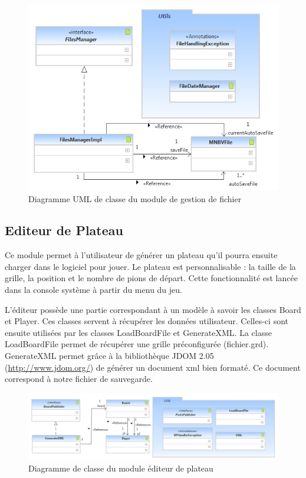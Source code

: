\begin{figure}[H]
\centering
\includegraphics[scale=1.0]{Architecture/FilesManagerLight.png}
\caption{Diagramme UML de classe du module de gestion de fichier}
\label{gest}
\end{figure}


\subsection{Editeur de Plateau}

Ce module permet à l'utilisateur de générer un plateau qu'il pourra ensuite charger dans le logiciel pour jouer. Le plateau est personnalisable : la taille de la grille, la position et le nombre de pions de départ. Cette fonctionnalité est lancée dans la console système à partir du menu du jeu.

L'éditeur possède une partie correspondant à un modèle à savoir les classes Board et Player. Ces classes servent à récupérer les données utilisateur. Celles-ci sont ensuite utilisées par les classes LoadBoardFile et GenerateXML. La classe LoadBoardFile permet de récupérer une grille préconfigurée (fichier.grd). GenerateXML permet grâce à la bibliothèque JDOM 2.05 (\url{http://www.jdom.org/}) de générer un document xml bien formaté. Ce document correspond à notre fichier de sauvegarde.

\begin{figure}[H]
\centering
\includegraphics[scale=0.58]{Architecture/BoardPublisherLight.png}
\caption{Diagramme de classe du module éditeur de plateau}
\label{edit}
\end{figure}

